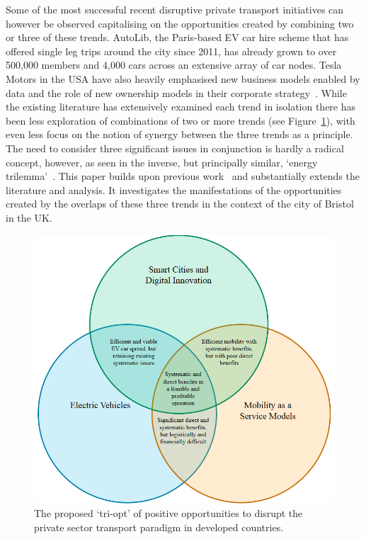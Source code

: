 \documentclass[b5paper,10pt]{article}
\begin{document}
Some of the most successful recent disruptive private transport
initiatives can however be observed capitalising on the opportunities
created by combining two or three of these trends. AutoLib, the
Paris-based EV car hire scheme that has offered single leg trips
around the city since 2011, has already grown to over 500,000 members
and 4,000 cars across an extensive array of car nodes. Tesla Motors in
the USA have also heavily emphasised new business models enabled by
data and the role of new ownership models in their corporate
strategy~\citep{musk:2016}. While the existing literature has
extensively examined each trend in isolation there has been less
exploration of combinations of two or more trends (see
Figure~\ref{fig:triopt}), with even less focus on the notion of
synergy between the three trends as a principle. The need to consider
three significant issues in conjunction is hardly a radical concept,
however, as seen in the inverse, but principally similar, `energy
trilemma'~\citep{wec:2015}. This paper builds upon previous
work~\citep{cooper-et-al-sose:2015} and substantially extends the
literature and analysis. It investigates the manifestations of the
opportunities created by the overlaps of these three trends in the
context of the city of Bristol in the UK.

\begin{figure}[!ht]
\centering
\includegraphics[width=0.6\columnwidth]{images/triopt.png}
\caption{The proposed `tri-opt' of positive opportunities to disrupt
  the private sector transport paradigm in developed countries.}
\label{fig:triopt}
\end{figure}

\end{document}
